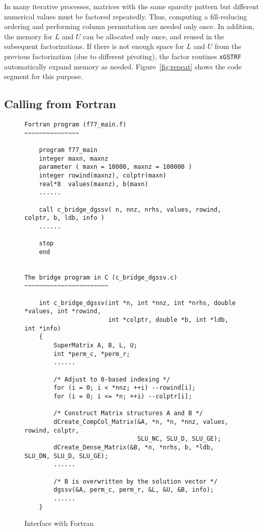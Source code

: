 In many iterative processes, matrices with the same sparsity
pattern but different numerical values must be factored
repeatedly. Thus, computing a fill-reducing ordering and performing
column permutation are needed only once. In addition, the memory
for $L$ and $U$ can be allocated only once, and reused in the
subsequent factorizations. If there is not enough space for $L$
and $U$ from the previous factorization (due to different pivoting),
the factor routines {\tt xGSTRF} automatically expand memory as needed.
Figure~\ref{fig:repeat} shows the code segment for this purpose.

\subsection{Calling from Fortran}

\begin{figure}
\begin{verbatim}
Fortran program (f77_main.f)
~~~~~~~~~~~~~~~

    program f77_main
    integer maxn, maxnz
    parameter ( maxn = 10000, maxnz = 100000 )
    integer rowind(maxnz), colptr(maxn)
    real*8  values(maxnz), b(maxn)
    ......

    call c_bridge_dgssv( n, nnz, nrhs, values, rowind, colptr, b, ldb, info )
    ......

    stop
    end


The bridge program in C (c_bridge_dgssv.c)
~~~~~~~~~~~~~~~~~~~~~~~

    int c_bridge_dgssv(int *n, int *nnz, int *nrhs, double *values, int *rowind, 
                       int *colptr, double *b, int *ldb, int *info)
    {
        SuperMatrix A, B, L, U;
        int *perm_c, *perm_r;
        ......

        /* Adjust to 0-based indexing */
        for (i = 0; i < *nnz; ++i) --rowind[i];
        for (i = 0; i <= *n; ++i) --colptr[i];
            
        /* Construct Matrix structures A and B */ 
        dCreate_CompCol_Matrix(&A, *n, *n, *nnz, values, rowind, colptr, 
                               SLU_NC, SLU_D, SLU_GE);
        dCreate_Dense_Matrix(&B, *n, *nrhs, b, *ldb, SLU_DN, SLU_D, SLU_GE);
        ......

        /* B is overwritten by the solution vector */
        dgssv(&A, perm_c, perm_r, &L, &U, &B, info);
        ......
    }
\end{verbatim}
\caption{Interface with Fortran}
\label{fig:fortran}
\end{figure}

